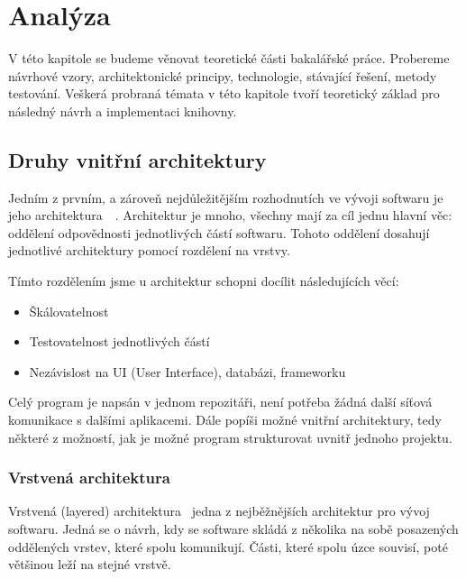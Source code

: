 \chapter{Analýza}

V této kapitole se budeme věnovat teoretické části bakalářské práce. Probereme návrhové vzory, architektonické principy, technologie, stávající řešení, metody testování. Veškerá probraná témata v této kapitole tvoří teoretický základ pro následný návrh a implementaci knihovny.

\section{Druhy vnitřní architektury}
\label{internal architectures}

Jedním z prvním, a zároveň nejdůležitějším rozhodnutích ve vývoji softwaru je jeho architektura~\cite{Architecture}~\cite{Monolitic}. Architektur je mnoho, všechny mají za cíl jednu hlavní věc: oddělení odpovědnosti jednotlivých částí softwaru. Tohoto oddělení dosahují jednotlivé architektury pomocí rozdělení na vrstvy.

Tímto rozdělením jsme u architektur schopni docílit následujících věcí:

\begin{itemize}
    \item Škálovatelnost
    \item Testovatelnost jednotlivých částí
    \item Nezávislost na UI (User Interface), databázi, frameworku
\end{itemize}

Celý program je napsán v jednom repozitáři, není potřeba žádná další síťová komunikace s dalšími aplikacemi. Dále popíši možné vnitřní architektury, tedy některé z možností, jak je možné program strukturovat uvnitř jednoho projektu.

\subsection{Vrstvená architektura}
\label{layered architecture}

Vrstvená (layered) architektura~\cite{Layer1} jedna z nejběžnějších architektur pro vývoj softwaru.  Jedná se o návrh, kdy se software skládá z několika na sobě posazených oddělených vrstev, které spolu komunikují. Části, které spolu úzce souvisí, poté většinou leží na stejné vrstvě.


